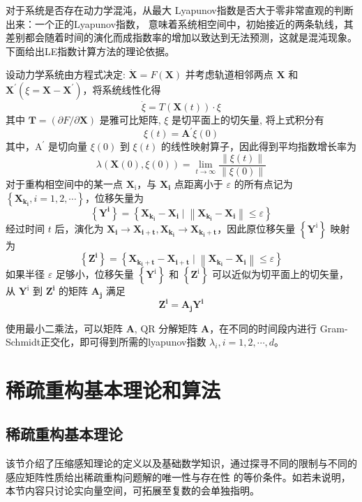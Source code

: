 对于系统是否存在动力学混沌，从最大 Lyapunov指数是否大于零非常直观的判断出来：一个正的Lyapunov指数，
意味着系统相空间中，初始接近的两条轨线，其差别都会随着时间的演化而成指数率的增加以致达到无法预测，这就是混沌现象。
下面给出LE指数计算方法的理论依据。\par
设动力学系统由方程式决定: $\dot{\mathbf{X}}=F(\mathbf{X})$
并考虑轨道相邻两点 $\mathbf{X}$ 和 $\mathbf{X}^{\prime}\left(\xi=\mathbf{X}-\mathbf{X}^{\prime}\right)$，将系统线性化得
$$\dot{\xi}=T(\mathbf{X}(t)) \cdot \xi$$
其中 $\mathbf{T}=(\partial F / \partial \mathbf{X})$ 是雅可比矩阵, $\xi$ 是切平面上的切矢量, 将上式积分有
$$\xi(t)=\mathbf{A}^{\prime} \xi(0)$$
其中，$\mathrm{A}^{\prime}$ 是切向量 $\xi(0)$ 到 $\xi(t)$ 的线性映射算子，因此得到平均指数增长率为
$$\lambda(\mathbf{X}(0), \xi(0))=\lim _{t \rightarrow \infty} \frac{\|\xi(t)\|}{\|\xi(0)\|}$$
对于重构相空间中的某一点 $\mathbf{X}_{\mathrm{i}}$，与 $\mathbf{X}_{\mathbf{i}}$ 点距离小于 $\varepsilon$ 的所有点记为 $\left\{\mathbf{X}_{\mathbf{k}_{\mathbf{i}}}, i=1,2, \cdots\right\}$，位移矢量为 
$$\left\{\mathbf{Y}^{\mathbf{i}}\right\}=\left\{\mathbf{X}_{\mathbf{k}_{\mathbf{i}}}-\mathbf{X}_{\mathbf{i}} \mid\left\|\mathbf{X}_{\mathbf{k}_{\mathbf{i}}}-\mathbf{X}_{\mathbf{i}}\right\| \leq \varepsilon\right\}$$
经过时间 $t$ 后，演化为 $\mathbf{X}_{\mathbf{i}} \rightarrow \mathbf{X}_{\mathbf{i + t}}, \mathbf{X}_{\mathbf{k}_{\mathbf{i}}} \rightarrow \mathbf{X}_{\mathbf{k}_{\mathbf{i}}+\mathbf{t}}$，因此原位移矢量 $\left\{\mathbf{Y}^{\mathrm{i}}\right\}$ 映射为
$$\left\{\mathbf{Z}^{\mathbf{i}}\right\}=\left\{\mathbf{X}_{\mathbf{k}_{\mathbf{i}}+\mathbf{t}}-\mathbf{X}_{\mathbf{i}+\mathbf{t}} \mid\left\|\mathbf{X}_{\mathbf{k}_{\mathbf{i}}}-\mathbf{X}_{\mathbf{i}}\right\| \leq \varepsilon\right\}$$
如果半径 $\varepsilon$ 足够小，位移矢量 $\left\{\mathbf{Y}^{\mathrm{i}}\right\}$ 和 $\left\{\mathbf{Z}^{\mathrm{i}}\right\}$ 可以近似为切平面上的切矢量，从 $\mathbf{Y}^{\mathrm{i}}$ 到 $\mathbf{Z}^{\mathbf{i}}$ 的矩阵 $\mathbf{A}_{\mathbf{j}}$ 满足
$$\mathbf{Z}^{\mathbf{i}}=\mathbf{A}_{\mathbf{j}} \mathbf{Y}^{\mathbf{i}}$$

使用最小二乘法，可以矩阵 $\mathbf{A}$, $\mathrm{QR}$ 分解矩阵 $\mathbf{A}$，在不同的时间段内进行 Gram-Schmidt正交化，即可得到所需的lyapunov指数 $\lambda_{i}, i=1,2, \cdots, d$。\par
\section{稀疏重构基本理论和算法}
\subsection{稀疏重构基本理论}
该节介绍了压缩感知理论的定义以及基础数学知识，通过探寻不同的限制与不同的感应矩阵性质给出稀疏重构问题解的唯一性与存在性
的等价条件。如若未说明，本节内容只讨论实向量空间，可拓展至复数的会单独指明。
